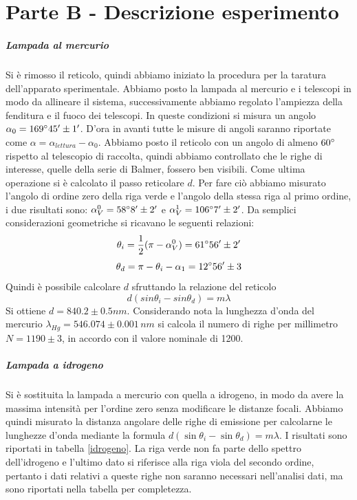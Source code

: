 \documentclass[10pt,a4paper]{article}
\begin{document}
\begin{table}[!htb]
\section{Parte B - Descrizione esperimento}
\subparagraph{Lampada al mercurio}
Si è rimosso il reticolo, quindi abbiamo iniziato la procedura per la taratura dell'apparato sperimentale. Abbiamo posto la lampada al mercurio e i telescopi in modo da allineare il sistema, successivamente abbiamo regolato l'ampiezza della fenditura e il fuoco dei telescopi. In queste condizioni si misura un angolo $\alpha_0 = 169 \degree 45 '\pm 1'$. D'ora in avanti tutte le misure di angoli saranno riportate come $\alpha=\alpha_{lettura}-\alpha_0$. Abbiamo posto il reticolo con un angolo di almeno $60\degree$ rispetto al telescopio di raccolta, quindi abbiamo controllato che le righe di interesse, quelle della serie di Balmer, fossero ben visibili.
Come ultima operazione si è calcolato il passo reticolare $d$. Per fare ciò abbiamo misurato l'angolo di ordine zero della riga verde e l'angolo della stessa riga al primo ordine, i due risultati sono: $\alpha_V^{0} = 58 \degree 8 ' \pm 2'$ e $\alpha_V^{1} = 106 \degree 7' \pm 2'$. Da semplici considerazioni geometriche si ricavano le seguenti relazioni:
\begin{equation}
\theta_i=\frac{1}{2}(\pi-\alpha_V^{0})=61\degree 56'\pm2'
\end{equation}
\begin{equation}
\theta_d=\pi-\theta_i-\alpha_1= 12 \degree 56' \pm 3
\end{equation}
Quindi è possibile calcolare $d$ sfruttando la relazione del reticolo 
\begin{equation}
d(sin{\theta_i}-sin{\theta_d})=m\lambda
\end{equation}
Si ottiene $d = 840.2 \pm 0.5 nm$. Considerando nota la lunghezza d'onda del mercurio $\lambda_{Hg}=546.074\pm0.001\,nm$ si calcola il numero di righe per millimetro $N = 1190 \pm 3$, in accordo con il valore nominale di 1200.

\subparagraph{Lampada a idrogeno}
Si è sostituita la lampada a mercurio con quella a idrogeno, in modo da avere la massima intensità per l'ordine zero senza modificare le distanze focali. Abbiamo quindi misurato la distanza angolare delle righe di emissione per calcolarne le lunghezze d'onda mediante la formula $d(\sin{\theta_i}-\sin{\theta_d})=m\lambda$. I risultati sono riportati in tabella \ref{idrogeno}. La riga verde non fa parte dello spettro dell'idrogeno e l'ultimo dato si riferisce alla riga viola del secondo ordine, pertanto i dati relativi a queste righe non saranno necessari nell'analisi dati, ma sono riportati nella tabella per completezza.\\


\end{table}
\end{document}

